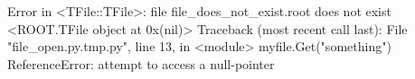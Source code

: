 \begin{footnotesize}
\begin{pyglist}[language=text,texcl=true,abovecaptionskip=0,style=bw]
Error in <TFile::TFile>: file file_does_not_exist.root does not exist
<ROOT.TFile object at 0x(nil)>
Traceback (most recent call last):
  File "file_open.py.tmp.py", line 13, in <module>
    myfile.Get("something")
ReferenceError: attempt to access a null-pointer
\end{pyglist}
\end{footnotesize}
